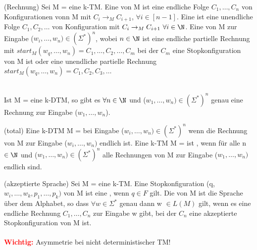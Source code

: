 \documentclass[a4paper]{article}
\begin{document}
\begin{DefBox}{(Rechnung)}
Sei M = \TM eine k-TM. Eine  von M ist eine endliche Folge $C_1,\dots,C_n$ von Konfigurationen vonn M mit $C_i \rightarrow_M C_{i+1}$, $\forall i \in [n-1]$. Eine  ist eine unendliche Folge $C_1,C_2,\dots$ von Konfiguration mit $C_i \rightarrow_M C_{i+1} \ \forall i \in \N$. Eine  von M zur Eingabe ($w_i,\dots,w_n) \in (\Sigma^*)^n$, wobei $n \in \N$ ist eine endliche partielle Rechnung mit $start_M (w_q,\dots,w_n) = C_1,\dots,C_2,\dots,C_m$ bei der $C_m$ eine Stopkonfiguration von M ist oder eine unendliche partielle Rechnung $start_M (w_q,\dots,w_n) = C_1,C_2,C_3,\dots$
\end{DefBox}
 \stepBoxCounter \\
Ist M = \TM eine k-DTM, so gibt es $\forall n \in \N$ und ($w_1,\dots,w_n) \in (\Sigma^*)^n$ genau eine Rechnung zur Eingabe ($w_1,\dots,w_n$).

\begin{DefBox}{(total)}
Eine k-DTM M = \TM {} bei Eingabe ($w_i,\dots,w_n) \in (\Sigma^*)^n$ wenn die Rechnung von M zur Eingabe ($w_i,\dots,w_n)$ endlich ist. Eine k-TM M = \TM ist , wenn für alle n $\in \N$ und ($w_1,\dots,w_n) \in (\Sigma^*)^n$ alle Rechnungen von M zur Eingabe ($w_1,\dots,w_n)$ endlich sind.
\end{DefBox}

\begin{DefBox}{(akzeptierte Sprache)}
 Sei M = \TM eine k-TM. Eine Stopkonfiguration (q,$w_i,\dots,w_k,p_1,\dots,p_k)$ von M ist eine , wenn $q \in F$ gilt. Die  von M ist die Sprache über dem Alphabet, so dass $\forall w \in \Sigma^*$ genau dann w $\in L(M)$ gilt, wenn es eine endliche Rechnung $C_1,\dots,C_n$ zur Eingabe w gibt, bei der $C_n$ eine akzeptierte Stopkonfiguration von M ist. \\
 \\
\textbf{\textcolor{red}{Wichtig:}} Asymmetrie bei nicht deterministischer TM!
\end{DefBox}
\end{document}
